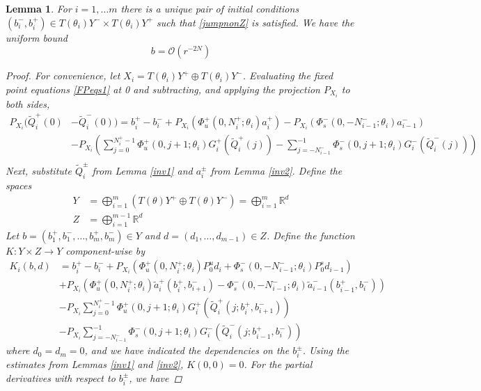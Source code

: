 \documentclass[12pt]{article}
\def\R{{\mathbb R}}
\newtheorem{lemma}{Lemma}
\begin{document}
\begin{lemma}\label{inv3nt}
For $i = 1, \dots m$ there is a unique pair of initial conditions $(b_i^-, b_i^+) \in T(\theta_i) Y^- \times T(\theta_i) Y^+$ such that \eqref{jumpnonZ} is satisfied. We have the uniform bound
\begin{equation}\label{bboundnt}
b = \mathcal{O}(r^{-2N})
\end{equation}

\begin{proof}
For convenience, let $X_i = T(\theta_i)Y^+ \oplus T(\theta_i)Y^-$. Evaluating the fixed point equations \eqref{FPeqs1} at 0 and subtracting, and applying the projection $P_{X_i}$ to both sides, 
\begin{align*}
P_{X_i}( \tilde{Q}_i^+(0) &- \tilde{Q}_i^-(0)) = b_i^+ - b_i^- 
+ P_{X_i}( \Phi_u^+(0, N_i^+; \theta_i) a_i^+) - P_{X_i}( \Phi_s^-(0, -N_{i-1}^-; \theta_i) a_{i-1}^-)  \\
&- P_{X_i} \left( \sum_{j = 0}^{N_i^+-1} \Phi_u^+(0, j+1; \theta_i) G_i^+(\tilde{Q}_i^+(j)) 
- \sum_{j = -N_{i-1}^-}^{-1} \Phi_s^-(0, j+1; \theta_i) G_i^-(\tilde{Q}_i^-(j)) \right) \\
\end{align*}
Next, substitute $\tilde{Q}_i^\pm$ from Lemma \ref{inv1} and $a_i^\pm$ from Lemma \ref{inv2}. Define the spaces
\begin{align}\label{spaceYt}
Y &= \bigoplus_{i=1}^m (T(\theta) Y^+ \oplus T(\theta) Y^-) = \bigoplus_{i=1}^m \R^d \\
Z &= \bigoplus_{i=1}^{m-1} \R^d
\end{align}
Let $b = (b_1^+, b_1^-, \dots, b_m^+, b_m^-) \in Y$ and $d = (d_1, \dots, d_{m-1}) \in Z$. Define the function $K: Y \times Z \rightarrow Y$ component-wise by
\begin{align*}
K_i(b, d) &= 
 b_i^+ - b_i^- + P_{X_i} \left( \Phi_u^+(0, N_i^+; \theta_i) P_0^u d_i + \Phi_s^-(0, -N_{i-1}^-; \theta_i) P_0^s d_{i-1} \right) \\
&+ P_{X_i}\left( \Phi_u^+(0, N_i^+; \theta_i) \tilde{a}_i^+(b_i^+, b_{i+1}^-) 
- \Phi_s^-(0, -N_{i-1}^-; \theta_i) \tilde{a}_{i-1}^-(b_{i-1}^+, b_i^-) \right) \\
&- P_{X_i} \sum_{j = 0}^{N_i^+-1} \Phi_u^+(0, j+1; \theta_i) G_i^+(\tilde{Q}_i^+(j; b_i^+, b_{i+1}^-)) \\
&- P_{X_i} \sum_{j = -N_{i-1}^-}^{-1} \Phi_s^-(0, j+1; \theta_i) G_i^-(\tilde{Q}_i^-(j; b_{i-1}^+, b_i^-))
\end{align*}
where $d_0 = d_m = 0$, and we have indicated the dependencies on the $b_i^\pm$. Using the estimates from Lemmas \ref{inv1} and \ref{inv2}, $K(0, 0) = 0$. For the partial derivatives with respect to $b_i^\pm$, we have

\end{proof}
\end{lemma}
\end{document}
